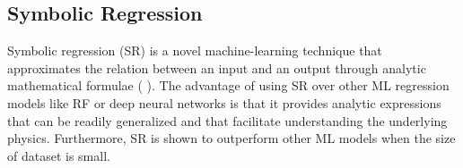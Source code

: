 \subsection{Symbolic Regression}

Symbolic regression (SR) is a novel machine-learning technique that approximates the relation between an input and an output through analytic mathematical formulae (\cite{schmidt2009distilling} \cite{udrescu2020ai} \cite{wu2019toward} \cite{cranmer2020discovering} \cite{villaescusa2021camels} \cite{kim2020integration} \cite{liu2021machine}). The advantage of using SR over other ML regression models like RF or deep neural networks is that it provides analytic expressions that can be readily generalized and that facilitate understanding the underlying physics. Furthermore, SR is shown to outperform other ML models when the size of dataset is small\cite{wilstrup2021symbolic}. 